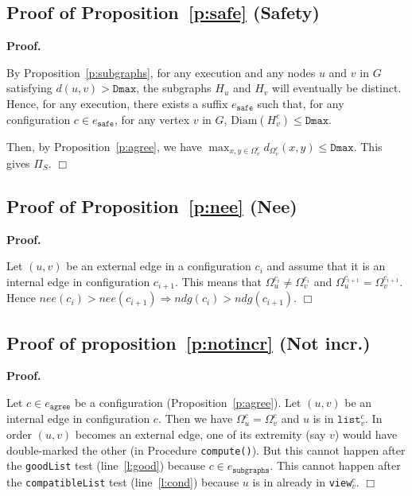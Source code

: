 \documentclass[11pt,english]{article}
\newenvironment{proof}[1][0cm]{
  \begin{list}{\bf Proof.~}{
      \setlength{\itemindent}{0cm}
      \setlength{\labelsep}{0cm}
      \setlength{\labelwidth}{#1}
      \setlength{\leftmargin}{#1}
    \item
    }
}{\hfill$\Box$
  \end{list}
}
\begin{document}
\subsection{Proof of Proposition~\ref{p:safe} (Safety)}

\begin{proof}
  By Proposition~\ref{p:subgraphs}, for any execution and any nodes $u$ and $v$
  in $G$ satisfying $d(u,v) > \texttt{Dmax}$, the subgraphs $H_u$ and $H_v$ will
  eventually be distinct. Hence, for any execution, there exists a suffix
  $e_\texttt{safe}$ such that, for any configuration $c \in e_\texttt{safe}$,
  for any vertex $v$ in $G$, $\text{Diam}(H_v^c) \leq \texttt{Dmax}$.

  Then, by Proposition~\ref{p:agree}, we have $\max_{x,y \in \Omega_v^c}
  d_{\Omega_v^c}(x,y) \leq \texttt{Dmax}$. This gives $\Pi_S$.
\end{proof}

\subsection{Proof of Proposition~\ref{p:nee} (Nee)}

 \begin{proof}
   Let $(u,v)$ be an external edge in a configuration $c_i$ and assume that it is
   an internal edge in configuration $c_{i+1}$. This means that $\Omega_u^{c_i}
   \neq \Omega_v^{c_i}$ and $\Omega_u^{c_{i+1}} = \Omega_v^{c_{i+1}}$. Hence
   $nee(c_i) > nee(c_{i+1}) \Rightarrow ndg(c_i) > ndg(c_{i+1})$.
 \end{proof}

\subsection{Proof of proposition~\ref{p:notincr} (Not incr.)}

\begin{proof}
  Let $c \in e_\texttt{agree}$ be a configuration (Proposition~\ref{p:agree}).
  Let $(u,v)$ be an internal edge in configuration $c$. Then we have $\Omega_u^c
  = \Omega_v^c$ and $u$ is in $\texttt{list}_v^c$.
In order $(u,v)$ becomes an external edge, one of its extremity (say $v$)
  would have double-marked the other (in Procedure \texttt{compute()}). But this
  cannot happen after the \texttt{goodList} test (line~\ref{l:good}) because $c
  \in e_\texttt{subgraphs}$. This cannot happen after the \texttt{compatibleList}
  test (line~\ref{l:cond}) because $u$ is in already in \texttt{view}$_v^c$.
\end{proof}
\end{document}
